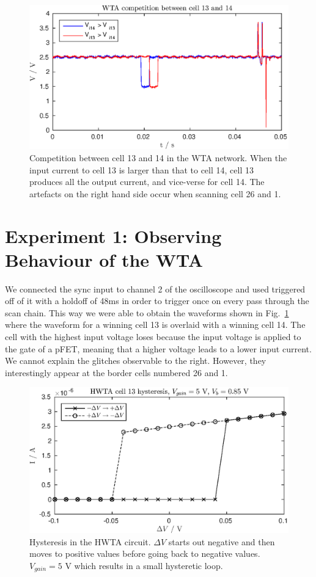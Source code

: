 

\newcommand{\reffig}[1]{Fig.~\ref{#1}}



\newpage
\begin{figure}
    \center
    \includegraphics{ex1.eps}
    \caption{Competition between cell 13 and 14 in the WTA network. When the input current to cell 13 is larger than that to cell 14, cell 13 produces all the output current, and
        vice-verse for cell 14. 
    The artefacts on the right hand side occur when scanning cell 26 and 1.}
    \label{fig:ex1}
\end{figure}
\section{Experiment 1: Observing Behaviour of the WTA}
We connected the sync input to channel 2 of the oscilloscope and used triggered off of it with a holdoff of 48ms in order to trigger once on every pass through the
scan chain. This way we were able to obtain the waveforms shown in Fig.~\ref{fig:ex1} where the waveform for a winning cell 13 is overlaid with a winning cell 14.
The cell with the highest input voltage loses because the input voltage is applied to the gate of a pFET, meaning that a higher voltage leads to a lower input current.
We cannot explain the glitches observable to the right. However, they interestingly appear at the border cells numbered 26 and 1.
\begin{figure}
    \center
    \includegraphics{ex2-1.eps}
    \caption{Hysteresis in the HWTA circuit. \(\Delta V\) starts out negative and then moves to positive values before going back to negative values.
    \(V_{gain}=5\) V which results in a small hysteretic loop.}
    \label{fig:ex2-1}
\end{figure}
